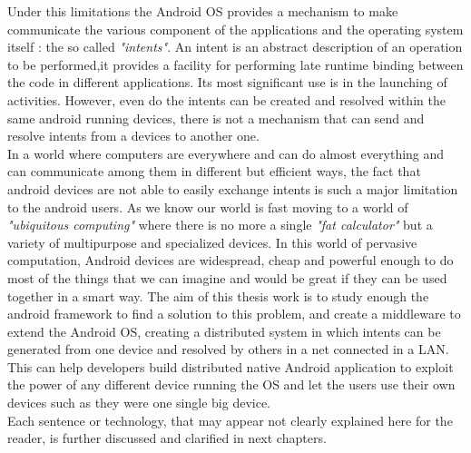 Under this limitations the Android OS provides a mechanism to make communicate the various component of the applications and the operating system itself : the so called \textit{"intents"}. An intent is an abstract description of an operation to be performed,it provides a facility for performing late runtime binding between the code in different applications. Its most significant use is in the launching of activities. However, even do the intents can be created and resolved within the same android running devices, there is not a mechanism that can send and resolve intents from a devices to another one.\\
In a world where computers are everywhere and can do almost everything and can communicate among them in different but efficient ways, the fact that android devices are not able to easily exchange intents is such a major limitation to the android users. As we know our world is fast moving to a world of \textit{"ubiquitous computing"} where there is no more a single \textit{"fat calculator"} but a variety of multipurpose and specialized devices. In this world of pervasive computation, Android devices are widespread, cheap and powerful enough to do most of the things that we can imagine and would be great if they can be used together in a smart way.
The aim of this thesis work is to study enough the android framework to find a solution to this problem, and create a middleware to extend the Android OS, creating a distributed system in which intents can be generated from one device and resolved by others in a net connected in a LAN. This can help developers build distributed native Android application to exploit the power of any different device running the OS and let the users use their own devices such as they were one single big device.
\\Each sentence or technology, that may appear not clearly explained here for the reader, is further discussed and clarified in next chapters.

%
%
